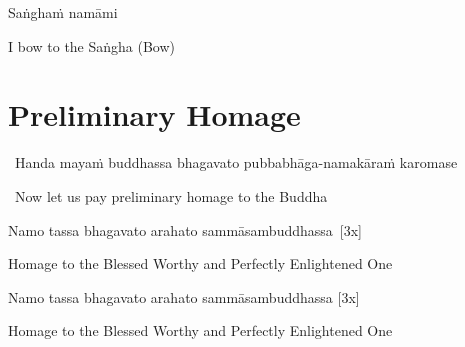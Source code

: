 Saṅghaṁ namāmi

\begin{english}
  I bow to the Saṅgha \hfill{\textnormal{\ifafive\fontsize{12.5}{18}\fi\ifninebythirteen\fontsize{9}{13}\fi\selectfont (Bow)}}
\end{english}

\suttaRef{[Trad]}



\section{Preliminary Homage}
\label{preliminary-homage}

\begin{leader}
  \anglebracketleft\ \hspace{-0.5mm}Handa mayaṁ buddhassa bhagavato pubbabhāga-namakāraṁ karomase \hspace{-0.5mm}\anglebracketright\
\end{leader}

\begin{leader-english-below-pali}
  \anglebracketleft\ \hspace{-0.5mm}Now let us pay preliminary homage to the Buddha \hspace{-0.5mm}\anglebracketright\
\end{leader-english-below-pali}

\ifninebythirteen
\begin{pali-hang}
Namo tassa bhagavato arahato sammāsambuddhassa~\hfill{[3x]}
\end{pali-hang}

\begin{english-hang}
  Homage to the Blessed Worthy and Perfectly Enlightened One \hfill{\textnormal{\ifafive\fontsize{12.5}{18}\fi\ifninebythirteen\fontsize{9}{13}\fi\selectfont [3x]}}
\end{english-hang}

\else
Namo tassa bhagavato arahato sammāsambuddhassa \hfill{[3x]}

\begin{english-hang}
  Homage to the Blessed Worthy and Perfectly Enlightened One \hfill{\textnormal{\ifafive\fontsize{12.5}{18}\fi\ifninebythirteen\fontsize{9}{13}\fi\selectfont [3x]}}
\end{english-hang}
\fi

\suttaRef{[DN 21]}



